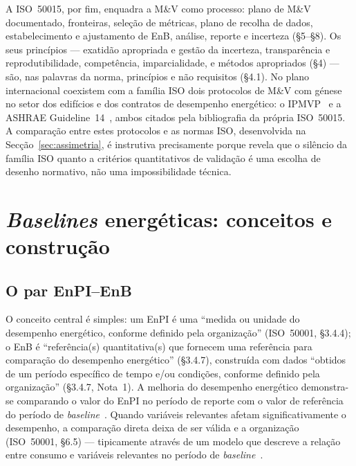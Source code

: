 A ISO~50015, por fim, enquadra a M\&V como processo: plano de M\&V documentado, fronteiras, seleção de métricas, plano de recolha de dados, estabelecimento e ajustamento de EnB, análise, reporte e incerteza (\S5--\S8). Os seus princípios --- exatidão apropriada e gestão da incerteza, transparência e reprodutibilidade,  competência, imparcialidade,  e métodos apropriados (\S4) --- são, nas palavras da norma, princípios e não requisitos (\S4.1). No plano internacional coexistem com a família ISO dois protocolos de M\&V com génese no setor dos edifícios e dos contratos de desempenho energético: o IPMVP~\cite{IPMVP_2022} e a ASHRAE Guideline~14~\cite{ASHRAE14_2014}, ambos citados pela bibliografia da própria ISO~50015. A comparação entre estes protocolos e as normas ISO, desenvolvida na Secção~\ref{sec:assimetria}, é instrutiva precisamente porque revela que o silêncio da família ISO quanto a critérios quantitativos de validação é uma escolha de desenho normativo, não uma impossibilidade técnica.

\section{\emph{Baselines} energéticas: conceitos e construção}
\label{sec:enb}

\subsection{O par EnPI--EnB}
\label{sec:enb-par}

O conceito central é simples: um EnPI é uma \enquote{medida ou unidade do desempenho energético, conforme definido pela organização} (ISO~50001, \S3.4.4); o EnB é \enquote{referência(s) quantitativa(s) que fornecem uma referência para comparação do desempenho energético} (\S3.4.7), construída com dados \enquote{obtidos de um período específico de tempo e/ou condições, conforme definido pela organização} (\S3.4.7, Nota~1). A melhoria do desempenho energético demonstra-se comparando o valor do EnPI no período de reporte com o valor de referência do período de \emph{baseline}~\cite[Figuras~1 e~3]{ISO50006_2014}. Quando variáveis relevantes afetam significativamente o desempenho, a comparação direta deixa de ser válida e a organização  (ISO~50001, \S6.5) --- tipicamente através de um modelo que descreve a relação entre consumo e variáveis relevantes no período de \emph{baseline}~\cite[\S4.5.1 e Anexo~D]{ISO50006_2014}.

